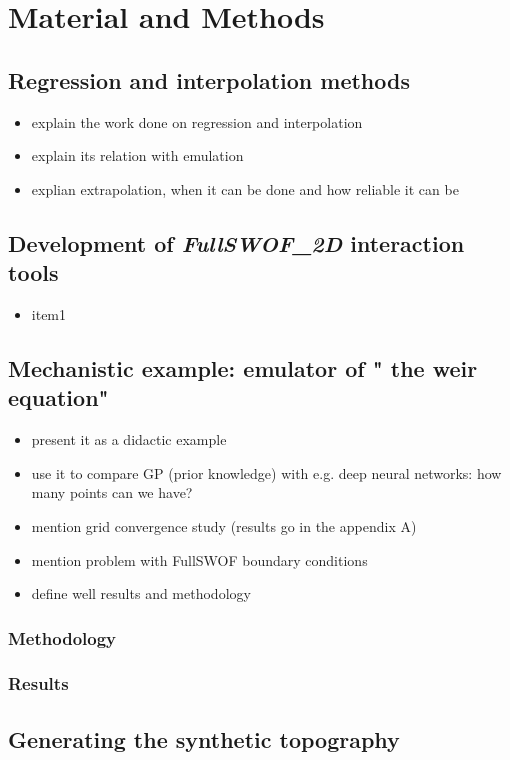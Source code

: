 \chapter{Material and Methods}
\label{chp:material_methods}

\section{Regression and interpolation methods}

\begin{itemize}
\itemsep0em
  \item explain the work done on regression and interpolation
  \item explain its relation with emulation
  \item explian extrapolation, when it can be done and how reliable it can be
\end{itemize}


\section{Development of \textit{FullSWOF\_2D} interaction tools}


\begin{itemize}
\itemsep0em
  \item item1
\end{itemize}


\section{Mechanistic example: emulator of " the weir equation"}


\begin{itemize}
\itemsep0em
  \item present it as a didactic example
  \item use it to compare GP (prior knowledge) with e.g. deep neural networks: how many points can we have?
  \item mention grid convergence study (results go in the appendix A)
  \item mention problem with FullSWOF boundary conditions
  \item define well results and methodology
\end{itemize}

\subsection{Methodology}

\subsection{Results}


\section{Generating the synthetic topography}

